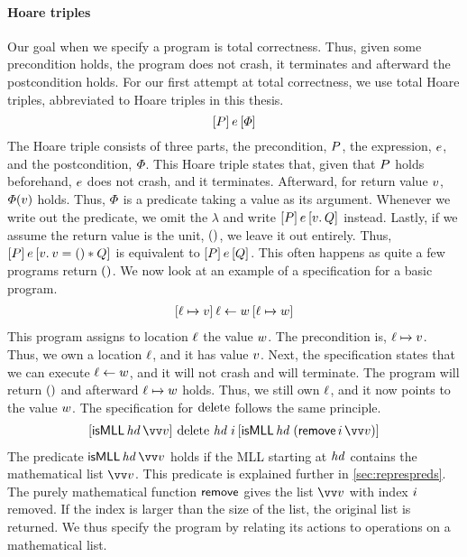 \documentclass[thesis.tex]{subfiles}
\begin{document}
\paragraph{Hoare triples}
Our goal when we specify a program is total correctness. Thus, given some precondition holds, the program does not crash, it terminates and afterward the postcondition holds. For our first attempt at total correctness, we use total Hoare triples, abbreviated to Hoare triples in this thesis.
\[\hoare{\prop}{\expr}{\pred}\]
The Hoare triple consists of three parts, the precondition, $P$, the expression, $e$, and the postcondition, $\varPhi$. This Hoare triple states that, given that $P$ holds beforehand, $e$ does not crash, and it terminates. Afterward, for return value $v$,  $\varPhi(v)$ holds. Thus, $\varPhi$ is a predicate taking a value as its argument. Whenever we write out the predicate, we omit the $\lambda$ and write $\hoare{\prop}{\expr}{\Ret\val. \propB}$ instead. Lastly, if we assume the return value is the unit, $()$, we leave it out entirely. Thus, $\hoare{\prop}\expr{\Ret\val. \val = \TT * \propB}$ is equivalent to $\hoare{\prop}\expr{\propB}$. This often happens as quite a few programs return $()$. We now look at an example of a specification for a basic program.
\begin{align*}
    \hoare{\loc\fmapsto\val}{\loc\gets\valB}{\loc\fmapsto\valB}
\end{align*}
This program assigns to location $\ell$ the value $w$. The precondition is, $\loc\fmapsto\val$. Thus, we own a location $\ell$, and it has value $v$. Next, the specification states that we can execute $\ell\leftarrow w$, and it will not crash and will terminate. The program will return $()$ and afterward $\loc\fmapsto\valB$ holds. Thus, we still own $\ell$, and it now points to the value $w$. The specification for $\operatorname{delete}$ follows the same principle.
\begin{align*}
    \hoare{\isMLL\, \hd\, \vect{\val}}{\MLLdelete\, \hd\; \iindex }{\isMLL\, \hd\; (\textlog{remove}\, \iindex\, \vect{\val})}
\end{align*}
The predicate $\isMLL\, \hd\, \vect{\val}$ holds if the MLL starting at $\mathit{hd}$ contains the mathematical list $\vect{\val}$. This predicate is explained further in \cref{sec:represpreds}. The purely mathematical function $\textsf{\upshape remove}$ gives the list $\vect{\val}$ with index $i$ removed. If the index is larger than the size of the list, the original list is returned. We thus specify the program by relating its actions to operations on a mathematical list.
\end{document}
